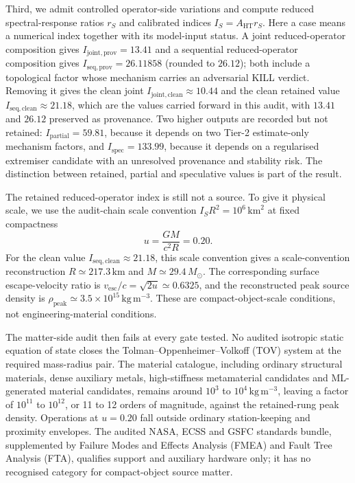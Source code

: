 \documentclass[11pt,a4paper]{article}
\begin{document}
Third, we admit controlled operator-side variations and compute reduced spectral-response ratios $r_{S}$ and calibrated indices $I_{S}=A_{\mathrm{HT}}r_{S}$. Here a case means a numerical index together with its model-input status. A joint reduced-operator composition gives $I_{\mathrm{joint,prov}}=13.41$ and a sequential reduced-operator composition gives $I_{\mathrm{seq,prov}}=26.11858$ (rounded to $26.12$); both include a topological factor whose mechanism carries an adversarial KILL verdict. Removing it gives the clean joint $I_{\mathrm{joint,clean}}\approx10.44$ and the clean retained value $I_{\mathrm{seq,clean}}\approx21.18$, which are the values carried forward in this audit, with $13.41$ and $26.12$ preserved as provenance. Two higher outputs are recorded but not retained: $I_{\mathrm{partial}}=59.81$, because it depends on two Tier-2 estimate-only mechanism factors, and $I_{\mathrm{spec}}=133.99$, because it depends on a regularised extremiser candidate with an unresolved provenance and stability risk. The distinction between retained, partial and speculative values is part of the result.

The retained reduced-operator index is still not a source. To give it physical scale, we use the audit-chain scale convention $I_{S}R^{2}=10^{6}\,\mathrm{km}^{2}$ at fixed compactness
\[
u=\frac{GM}{c^{2}R}=0.20.
\]
For the clean value $I_{\mathrm{seq,clean}}\approx21.18$, this scale convention gives a scale-convention reconstruction $R\simeq217.3\,\mathrm{km}$ and $M\simeq29.4\,M_{\odot}$. The corresponding surface escape-velocity ratio is $v_{\mathrm{esc}}/c=\sqrt{2u}\simeq0.6325$, and the reconstructed peak source density is $\rho_{\mathrm{peak}}\simeq3.5\times10^{15}\,\mathrm{kg\,m^{-3}}$. These are compact-object-scale conditions, not engineering-material conditions.

The matter-side audit then fails at every gate tested. No audited isotropic static equation of state closes the Tolman--Oppenheimer--Volkoff (TOV) system at the required mass-radius pair. The material catalogue, including ordinary structural materials, dense auxiliary metals, high-stiffness metamaterial candidates and ML-generated material candidates, remains around $10^{3}$ to $10^{4}\,\mathrm{kg\,m^{-3}}$, leaving a factor of $10^{11}$ to $10^{12}$, or 11 to 12 orders of magnitude, against the retained-rung peak density. Operations at $u=0.20$ fall outside ordinary station-keeping and proximity envelopes. The audited NASA, ECSS and GSFC standards bundle, supplemented by Failure Modes and Effects Analysis (FMEA) and Fault Tree Analysis (FTA), qualifies support and auxiliary hardware only; it has no recognised category for compact-object source matter.
\end{document}
